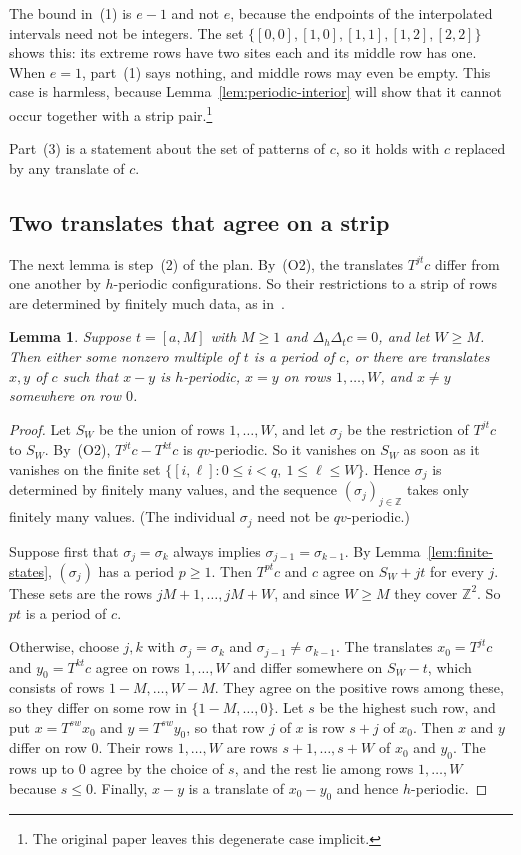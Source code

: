 \documentclass[11pt,a4paper,reqno]{amsart}
\newtheorem{lemma}[theorem]{Lemma}
\theoremstyle{definition}
\theoremstyle{remark}
\newcommand{\Z}{\mathbb Z}
\newcommand{\De}{\Delta}
\newcommand{\rc}[2]{[#1,#2]}
\numberwithin{equation}{section}
\begin{document}
The bound in~(1) is $e-1$ and not $e$, because the endpoints of the interpolated intervals need not be integers. The set $\{\rc00,\rc10,\rc11,\rc12,\rc22\}$ shows this: its extreme rows have two sites each and its middle row has one. When $e=1$, part~(1) says nothing, and middle rows may even be empty. This case is harmless, because Lemma~\ref{lem:periodic-interior} will show that it cannot occur together with a strip pair.\footnote{The original paper leaves this degenerate case implicit.}

Part~(3) is a statement about the set of patterns of $c$, so it holds with $c$ replaced by any translate of $c$.

\subsection{Two translates that agree on a strip}
The next lemma is step~(2) of the plan. By~(O2), the translates $T^{jt}c$ differ from one another by $h$-periodic configurations. So their restrictions to a strip of rows are determined by finitely much data, as in~\cite[Section~6]{Sz}.

\begin{lemma}\label{lem:strip-states}
Suppose $t=\rc aM$ with $M\ge1$ and $\De_h\De_tc=0$, and let $W\ge M$. Then either some nonzero multiple of $t$ is a period of $c$, or there are translates $x,y$ of $c$ such that $x-y$ is $h$-periodic, $x=y$ on rows $1,\ldots,W$, and $x\ne y$ somewhere on row $0$.
\end{lemma}

\begin{proof}
Let $S_W$ be the union of rows $1,\ldots,W$, and let $\sigma_j$ be the restriction of $T^{jt}c$ to $S_W$. By~(O2), $T^{jt}c-T^{kt}c$ is $qv$-periodic. So it vanishes on $S_W$ as soon as it vanishes on the finite set $\{\rc i\ell:0\le i<q,\ 1\le\ell\le W\}$. Hence $\sigma_j$ is determined by finitely many values, and the sequence $(\sigma_j)_{j\in\Z}$ takes only finitely many values. (The individual $\sigma_j$ need not be $qv$-periodic.)

Suppose first that $\sigma_j=\sigma_k$ always implies $\sigma_{j-1}=\sigma_{k-1}$. By Lemma~\ref{lem:finite-states}, $(\sigma_j)$ has a period $p\ge1$. Then $T^{pt}c$ and $c$ agree on $S_W+jt$ for every $j$. These sets are the rows $jM+1,\ldots,jM+W$, and since $W\ge M$ they cover $\Z^2$. So $pt$ is a period of $c$.

Otherwise, choose $j,k$ with $\sigma_j=\sigma_k$ and $\sigma_{j-1}\ne\sigma_{k-1}$. The translates $x_0=T^{jt}c$ and $y_0=T^{kt}c$ agree on rows $1,\ldots,W$ and differ somewhere on $S_W-t$, which consists of rows $1-M,\ldots,W-M$. They agree on the positive rows among these, so they differ on some row in $\{1-M,\ldots,0\}$. Let $s$ be the highest such row, and put $x=T^{sw}x_0$ and $y=T^{sw}y_0$, so that row $j$ of $x$ is row $s+j$ of $x_0$. Then $x$ and $y$ differ on row $0$. Their rows $1,\ldots,W$ are rows $s+1,\ldots,s+W$ of $x_0$ and $y_0$. The rows up to $0$ agree by the choice of $s$, and the rest lie among rows $1,\ldots,W$ because $s\le0$. Finally, $x-y$ is a translate of $x_0-y_0$ and hence $h$-periodic.
\end{proof}
\end{document}
